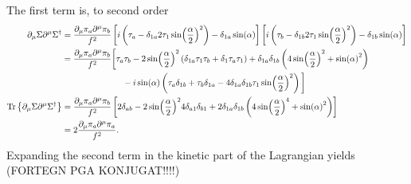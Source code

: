 \documentclass{article}
\begin{document}
The first term is, to second order
\begin{align*}
    \partial_\mu \Sigma \partial^\mu \Sigma^\dagger 
    & = \frac{\partial_\mu \pi_a \partial^\mu \pi_b}{f^2}
    \left[
        i\left(\tau_a - \delta_{1a} 2 \tau_1 \sin(\frac{\alpha}{2})^2 \right)
        - \delta_{1a}\sin(\alpha)
    \right]
    \left[
        i\left(\tau_b - \delta_{1b} 2 \tau_1 \sin(\frac{\alpha}{2})^2 \right)
        - \delta_{1b}\sin(\alpha)
    \right] \\
    & = \frac{\partial_\mu\pi_a \partial^\mu \pi_b}{f^2}
    \bigg[
        \tau_a\tau_b
        - 2 \sin(\frac{\alpha}{2})^2 
        \left(\delta_{1a}\tau_1 \tau_b + \delta_{1}\tau_a \tau_1\right)
            + \delta_{1a}\delta_{1b} \left(4 \sin(\frac{\alpha}{2})^2 + \sin(\alpha)^2 
        \right) \\
        &\phantom{=\frac{1}{f^2} \partial_\mu\pi_a \partial^\mu \pi_b \bigg[}
        - i \sin(\alpha)
        \left(
            \tau_a \delta_{1 b} + \tau_b \delta_{1 a} 
            - 4 \delta_{1 a}\delta_{1 b} \tau_1 \sin(\frac{\alpha}{2})^2
        \right)
    \bigg]\\
    \Tr\curly{\partial_\mu \Sigma \partial^\mu \Sigma^\dagger}
    & = \frac{ \partial_\mu\pi_a \partial^\mu \pi_b}{f^2}
    \left[
        2 \delta_{ab}- 2 \sin(\frac{\alpha}{2})^2 4 \delta_{a1}\delta_{b1}
        + 2 \delta_{1a}\delta_{1b}
        \left(4 \sin(\frac{\alpha}{2})^4 + \sin(\alpha)^2 \right)
    \right] \\
    & = 2 \frac{\partial_\mu \pi_a \partial^\mu \pi_a}{f^2}.
\end{align*}
Expanding the second term in the kinetic part of the Lagrangian yields (FORTEGN PGA KONJUGAT!!!!)
\end{document}
